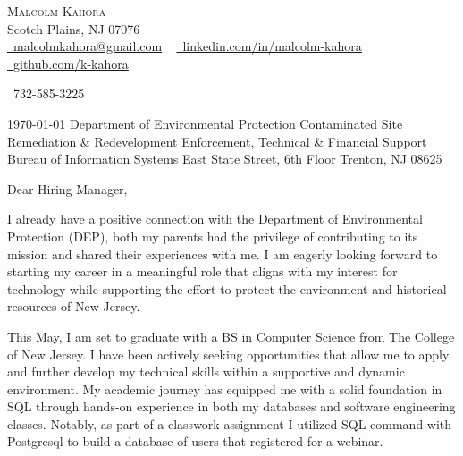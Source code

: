 \documentclass[letterpaper,11pt]{article}
\begin{document}
\begin{center}
    {\Huge \scshape Malcolm Kahora} \\ \vspace{1pt}
    Scotch Plains, NJ 07076 \\ \vspace{1pt}
     \href{malcolmkahora@gmail.com}{\raisebox{-0.2\height}\faEnvelope\  \underline{malcolmkahora@gmail.com}} ~ 
    \href{https://linkedin.com/in/malcolm-kahora/}{\raisebox{-0.2\height}\faLinkedin\ \underline{linkedin.com/in/malcolm-kahora}}  ~
    \href{https://github.com/k-kahora}{\raisebox{-0.2\height}\faGithub\ \underline{github.com/k-kahora}}

\end{center}
\vspace{-8pt}
\begin{center}
\small \raisebox{-0.1\height}\faPhone\ 732-585-3225 ~

\end{center}

 \null\hfill\today\newline %
Department of Environmental Protection \newline
Contaminated Site Remediation \& Redevelopment \newline
Enforcement, Technical \& Financial Support \newline
Bureau of Information Systems  East State Street, 6th Floor \newline
Trenton, NJ 08625 \newline

Dear Hiring Manager,

I already have a positive connection with the Department of Environmental Protection (DEP), both my parents
had the privilege of contributing to its mission and shared their experiences with me. I am eagerly
looking forward to starting my career in a meaningful role that aligns with my interest for technology
while supporting the effort to protect the environment and historical resources of New Jersey.

This May, I am set to graduate with a BS in Computer Science from The College of New Jersey. I have been
actively seeking opportunities that allow me to apply and further develop my technical skills within a supportive and dynamic environment. My academic journey has equipped me with a solid foundation in SQL through hands-on experience in both my databases and software engineering classes. Notably, as part of a classwork assignment I utilized SQL command with Postgresql to build a database of
users that registered for a webinar.  
\end{document}
